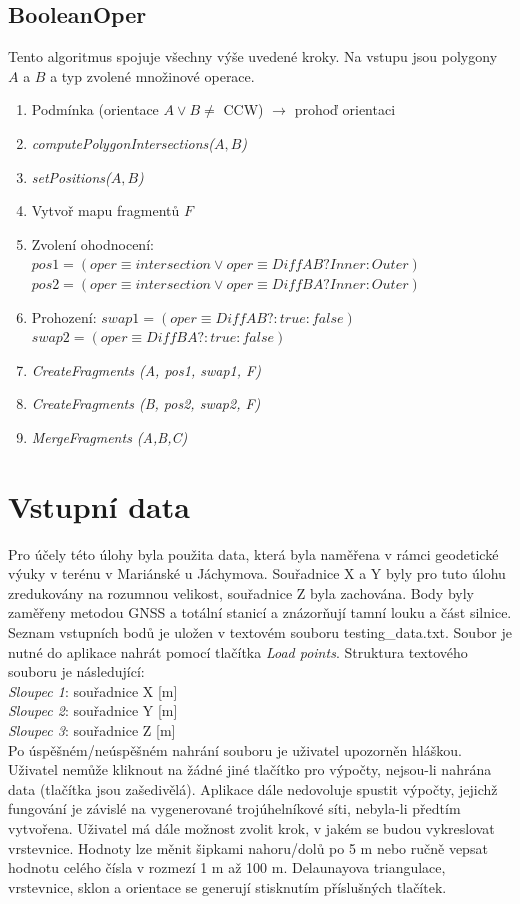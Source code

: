 \documentclass[a4paper, 12pt]{article}
\begin{document}
\subsection{BooleanOper}
Tento algoritmus spojuje všechny výše uvedené kroky. Na vstupu jsou polygony $A$ a $B$ a typ zvolené množinové operace.
\begin{enumerate}
\item Podmínka (orientace $A \lor B \neq$ CCW) $\rightarrow$ prohoď orientaci
\item \textit{computePolygonIntersections($A,B$)}
\item \textit{setPositions($A,B$)}
\item Vytvoř mapu fragmentů $F$
\item Zvolení ohodnocení: $pos1 = (oper \equiv intersection \lor oper \equiv DiffAB?Inner:Outer)$
\subitem \hspace {2.8cm} $pos2 = (oper \equiv intersection \lor oper \equiv DiffBA?Inner:Outer)$
\item Prohození: $swap1 = (oper \equiv DiffAB? : true : false)$
\subitem \hspace {1.2cm} $swap2 = (oper \equiv DiffBA? : true : false)$
\item \textit{CreateFragments (A, pos1, swap1, F)}
\item[] \textit{CreateFragments (B, pos2, swap2, F)}
\item \textit{MergeFragments (A,B,C)}

\end{enumerate}


\section{Vstupní data}
Pro účely této úlohy byla použita data, která byla naměřena v rámci geodetické výuky v terénu v Mariánské u Jáchymova. Souřadnice X a Y byly pro tuto úlohu zredukovány na rozumnou velikost, souřadnice Z byla zachována. Body byly zaměřeny metodou GNSS a totální stanicí a znázorňují tamní louku a část silnice. Seznam vstupních bodů je uložen v textovém souboru testing\_data.txt. Soubor je nutné do aplikace nahrát pomocí tlačítka \textsl{Load points}. Struktura textového souboru je následující:\\

\noindent
\textit{Sloupec 1}: souřadnice X [m]\\
\textit{Sloupec 2}: souřadnice Y [m]\\
\textit{Sloupec 3}: souřadnice Z [m]\\

Po úspěšném/neúspěšném nahrání souboru je uživatel upozorněn hláškou. Uživatel nemůže kliknout na žádné jiné tlačítko pro výpočty, nejsou-li nahrána data (tlačítka jsou zašedivělá). Aplikace dále nedovoluje spustit výpočty, jejichž fungování je závislé na vygenerované trojúhelníkové síti, nebyla-li předtím vytvořena. Uživatel má dále možnost zvolit krok, v jakém se budou vykreslovat vrstevnice. Hodnoty lze měnit šipkami nahoru/dolů po 5 m nebo ručně vepsat hodnotu celého čísla v rozmezí 1 m až 100 m. Delaunayova triangulace, vrstevnice, sklon a orientace se generují stisknutím příslušných tlačítek.
\end{document}
